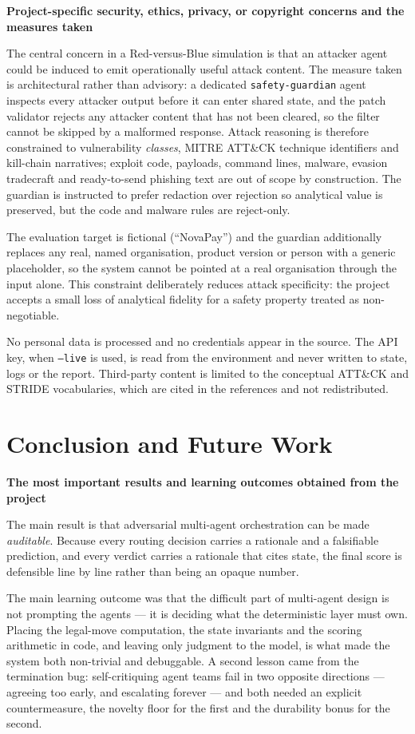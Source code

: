 \documentclass[11pt,a4paper]{article}
\newcommand{\qa}[2]{\textbf{#1}\par\vspace{-2pt}\begin{answerbox}#2\end{answerbox}}
\begin{document}
\qa{Project-specific security, ethics, privacy, or copyright concerns and the measures taken}{%
The central concern in a Red-versus-Blue simulation is that an attacker agent could be
induced to emit operationally useful attack content. The measure taken is architectural
rather than advisory: a dedicated \texttt{safety-guardian} agent inspects every attacker
output before it can enter shared state, and the patch validator rejects any attacker
content that has not been cleared, so the filter cannot be skipped by a malformed
response. Attack reasoning is therefore constrained to vulnerability \emph{classes}, MITRE
ATT\&CK technique identifiers and kill-chain narratives; exploit code, payloads,
command lines, malware, evasion tradecraft and ready-to-send phishing text are out of
scope by construction. The guardian is instructed to prefer redaction over rejection so
analytical value is preserved, but the code and malware rules are reject-only.

The evaluation target is fictional (``NovaPay'') and the guardian additionally replaces any
real, named organisation, product version or person with a generic placeholder, so the
system cannot be pointed at a real organisation through the input alone. This constraint
deliberately reduces attack specificity: the project accepts a small loss of analytical
fidelity for a safety property treated as non-negotiable.

No personal data is processed and no credentials appear in the source. The API key, when
\texttt{--live} is used, is read from the environment and never written to state, logs or
the report. Third-party content is limited to the conceptual ATT\&CK and STRIDE
vocabularies, which are cited in the references and not redistributed.}

\section{Conclusion and Future Work}

\qa{The most important results and learning outcomes obtained from the project}{%
The main result is that adversarial multi-agent orchestration can be made
\emph{auditable}. Because every routing decision carries a rationale and a falsifiable
prediction, and every verdict carries a rationale that cites state, the final score is
defensible line by line rather than being an opaque number.

The main learning outcome was that the difficult part of multi-agent design is not
prompting the agents --- it is deciding what the deterministic layer must own. Placing the
legal-move computation, the state invariants and the scoring arithmetic in code, and
leaving only judgment to the model, is what made the system both non-trivial and
debuggable. A second lesson came from the termination bug: self-critiquing agent teams
fail in two opposite directions --- agreeing too early, and escalating forever --- and both
needed an explicit countermeasure, the novelty floor for the first and the durability
bonus for the second.}
\end{document}
